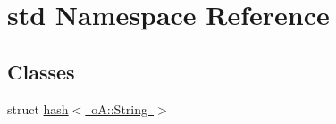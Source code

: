 \hypertarget{namespacestd}{}\section{std Namespace Reference}
\label{namespacestd}
\subsection*{Classes}
\begin{DoxyCompactItemize}
\item 
struct \mbox{\hyperlink{structstd_1_1hash_3_01o_a_1_1_string_01_4}{hash$<$ o\+A\+::\+String $>$}}
\end{DoxyCompactItemize}
